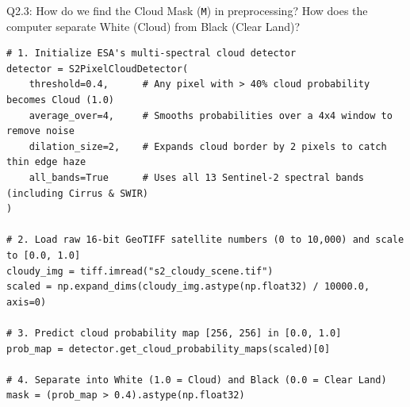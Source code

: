 \documentclass[11pt,a4paper]{article}
\begin{document}
\begin{qbox}{Q2.3: How do we find the Cloud Mask (\texttt{M}) in preprocessing? How does the computer separate White (Cloud) from Black (Clear Land)?}
\begin{lstlisting}[caption={Exact Preprocessing Code That Generates the Cloud Mask (from \texttt{rebuild\_cache\_v3.py})}]
# 1. Initialize ESA's multi-spectral cloud detector
detector = S2PixelCloudDetector(
    threshold=0.4,      # Any pixel with > 40% cloud probability becomes Cloud (1.0)
    average_over=4,     # Smooths probabilities over a 4x4 window to remove noise
    dilation_size=2,    # Expands cloud border by 2 pixels to catch thin edge haze
    all_bands=True      # Uses all 13 Sentinel-2 spectral bands (including Cirrus & SWIR)
)

# 2. Load raw 16-bit GeoTIFF satellite numbers (0 to 10,000) and scale to [0.0, 1.0]
cloudy_img = tiff.imread("s2_cloudy_scene.tif")
scaled = np.expand_dims(cloudy_img.astype(np.float32) / 10000.0, axis=0)

# 3. Predict cloud probability map [256, 256] in [0.0, 1.0]
prob_map = detector.get_cloud_probability_maps(scaled)[0]

# 4. Separate into White (1.0 = Cloud) and Black (0.0 = Clear Land)
mask = (prob_map > 0.4).astype(np.float32)
\end{lstlisting}
\end{qbox}
\end{document}
